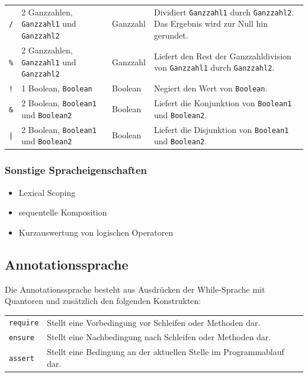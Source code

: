 \documentclass[a4paper,10pt]{article}
\begin{document}
\begin{tabularx}{\textwidth}{| l | X | l | X |}
\texttt{/} & 2 Ganzzahlen, \texttt{Ganzzahl1} und \texttt{Ganzzahl2} & Ganzzahl & Dividiert \texttt{Ganzzahl1} durch \texttt{Ganzzahl2}. Das Ergebnis wird zur Null hin gerundet.\\
\texttt{\%} & 2 Ganzzahlen, \texttt{Ganzzahl1} und \texttt{Ganzzahl2} & Ganzzahl & Liefert den Rest der Ganzzahldivision von \texttt{Ganzzahl1} durch \texttt{Ganzzahl2}.\\
\hline
\texttt{!} & 1 Boolean, \texttt{Boolean} & Boolean & Negiert den Wert von \texttt{Boolean}.\\
\texttt{\&} & 2 Boolean, \texttt{Boolean1} und \texttt{Boolean2} & Boolean & Liefert die Konjunktion von \texttt{Boolean1} und \texttt{Boolean2}.\\
\texttt{|} & 2 Boolean, \texttt{Boolean1} und \texttt{Boolean2} & Boolean & Liefert die Disjunktion von \texttt{Boolean1} und \texttt{Boolean2}.\\
\hline
\end{tabularx}
\subsubsection{Sonstige Spracheigenschaften}
\begin{itemize}
  \item Lexical Scoping
  \item sequentelle Komposition
  \item Kurzauswertung von logischen Operatoren
\end{itemize}

\subsection{Annotationssprache}
Die Annotationssprache besteht aus Ausdrücken der While-Sprache mit Quantoren und zusätzlich den folgenden Konstrukten:\\
\begin{tabularx}{\textwidth}{| l | X |}
\hline
\texttt{require} & Stellt eine Vorbedingung vor Schleifen oder Methoden dar.\\
\texttt{ensure} & Stellt eine Nachbedingung nach Schleifen oder Methoden dar.\\
\texttt{assert} & Stellt eine Bedingung an der aktuellen Stelle im Programmablauf dar.\\
\hline
\end{tabularx}
\end{document}
